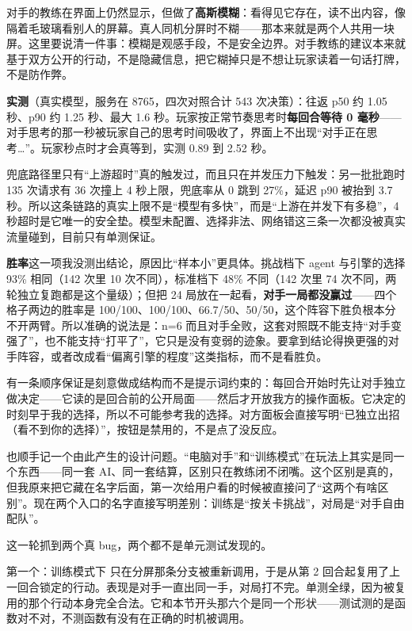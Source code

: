 对手的教练在界面上仍然显示，但做了\textbf{高斯模糊}：看得见它存在，读不出内容，像隔着毛玻璃看别人的屏幕。真人同机分屏时不糊——那本来就是两个人共用一块屏。这里要说清一件事：模糊是观感手段，不是安全边界。对手教练的建议本来就基于双方公开的行动，不是隐藏信息，把它糊掉只是不想让玩家读着一句话打牌，不是防作弊。

\textbf{实测}（真实模型，服务在 8765，四次对照合计 543 次决策）：往返 p50 约 1.05 秒、p90 约 1.25 秒、最大 1.6 秒。玩家按正常节奏思考时\textbf{每回合等待 0 毫秒}——对手思考的那一秒被玩家自己的思考时间吸收了，界面上不出现“对手正在思考…”。玩家秒点时才会真等到，实测 0.89 到 2.52 秒。

兜底路径里只有“上游超时”真的触发过，而且只在并发压力下触发：另一批批跑时 135 次请求有 36 次撞上 4 秒上限，兜底率从 0 跳到 27\%，延迟 p90 被抬到 3.7 秒。所以这条链路的真实上限不是“模型有多快”，而是“上游在并发下有多稳”，4 秒超时是它唯一的安全垫。模型未配置、选择非法、网络错这三条一次都没被真实流量碰到，目前只有单测保证。

\textbf{胜率}这一项我没测出结论，原因比“样本小”更具体。挑战档下 agent 与引擎的选择 93\% 相同（142 次里 10 次不同），标准档下 48\% 不同（142 次里 74 次不同，两轮独立复跑都是这个量级）；但把 24 局放在一起看，\textbf{对手一局都没赢过}——四个格子两边的胜率是 100/100、100/100、66.7/50、50/50，这个阵容下胜负根本分不开两臂。所以准确的说法是：n=6 而且对手全败，这套对照既不能支持“对手变强了”，也不能支持“打平了”，它只是没有变弱的迹象。要拿到结论得换更强的对手阵容，或者改成看“偏离引擎的程度”这类指标，而不是看胜负。

有一条顺序保证是刻意做成结构而不是提示词约束的：每回合开始时先让对手独立做决定——它读的是回合前的公开局面——然后才开放我方的操作面板。它决定的时刻早于我的选择，所以不可能参考我的选择。对方面板会直接写明“已独立出招（看不到你的选择）”，按钮是禁用的，不是点了没反应。

也顺手记一个由此产生的设计问题。“电脑对手”和“训练模式”在玩法上其实是同一个东西——同一套 AI、同一套结算，区别只在教练闭不闭嘴。这个区别是真的，但我原来把它藏在名字后面，第一次给用户看的时候被直接问了“这两个有啥区别”。现在两个入口的名字直接写明差别：训练是“按关卡挑战”，对局是“对手自由配队”。

这一轮抓到两个真 bug，两个都不是单元测试发现的。

第一个：训练模式下  只在分屏那条分支被重新调用，于是从第 2 回合起复用了上一回合锁定的行动。表现是对手一直出同一手，对局打不完。单测全绿，因为被复用的那个行动本身完全合法。它和本节开头那六个是同一个形状——测试测的是函数对不对，不测函数有没有在正确的时机被调用。

